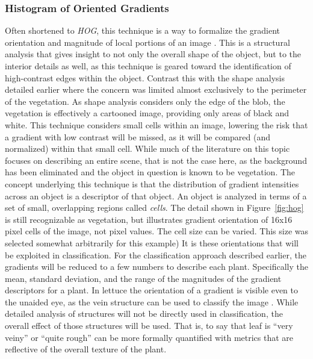 \documentclass[letterpaper, notitlepage]{report}
\begin{document}
\subsubsection{Histogram of Oriented Gradients}
Often shortened to \textit{HOG}, this technique is a way to formalize the gradient orientation and magnitude of local portions of an image \parencite[p.~155]{Forsyth2012-hy}. This is a structural analysis that gives insight to not only the overall shape of the object, but to the interior details as well, as this technique is geared toward the identification of high-contrast edges within the object. Contrast this with the shape analysis detailed earlier where the concern was limited almost exclusively to the perimeter of the vegetation.  As shape analysis considers only the edge of the blob, the vegetation is effectively a cartooned image, providing only areas of black and white. This technique considers small cells within an image, lowering the risk that a gradient with low contrast will be missed, as it will be compared (and normalized) within that small cell. While much of the literature on this topic focuses on describing an entire scene, that is not the case here, as the background has been eliminated and the object in question is known to be vegetation. The concept underlying this technique is that the distribution of gradient intensities across an object is a descriptor of that object. An object is analyzed in terms of a set of small, overlapping regions called \textit{cells}.
The detail shown in Figure~\ref{fig:hog} is still recognizable as vegetation, but illustrates gradient orientation of 16x16 pixel cells of the image, not pixel values. The cell size can be varied. This size was selected somewhat arbitrarily for this example) It is these orientations that will be exploited in classification.  For the classification approach described earlier, the gradients will be reduced to a few numbers to describe each plant. Specifically the mean, standard deviation, and the range of the magnitudes of the gradient descriptors for a plant. In lettuce the orientation of a gradient is visible even to the unaided eye, as the vein structure can be used to classify the image \parencite{Elhariri2014-eo}. While detailed analysis of structures will not be directly used in classification, the overall effect of those structures will be used. That is, to say that leaf is ``very veiny'' or ``quite rough'' can be more formally quantified with metrics that are reflective of the overall texture of the plant.
\end{document}
